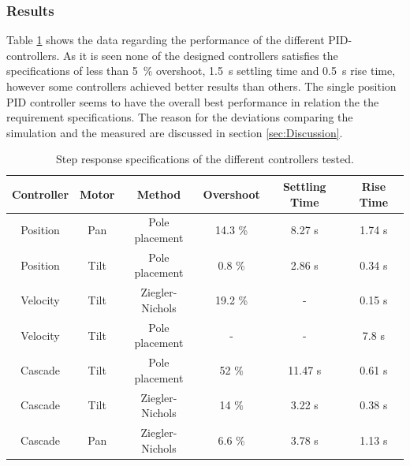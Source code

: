 \documentclass[../../main.tex]{subfiles}
\begin{document}
\subsubsection*{Results}
Table \ref{tab:controller_data} shows the data regarding the performance of the different PID-controllers. As it is seen none of the designed controllers satisfies the specifications of less than \SI{5}{\percent} overshoot, \SI{1,5}{\second} settling time and \SI{0,5}{\second} rise time, however some controllers achieved better results than others. The single position PID controller seems to have the overall best performance in relation the the requirement specifications. The reason for the deviations comparing the simulation and the measured are discussed in section \ref{sec:Discussion}.
\begin{table}[H]
    \centering
    \begin{tabular}{c|c|c|c|c|c}
         Controller & Motor & Method & Overshoot & Settling Time  & Rise Time \\ \hline
         Position & Pan & Pole placement & 14.3 \% & 8.27 s & 1.74 s \\
         Position & Tilt & Pole placement & 0.8 \% & 2.86 s & 0.34 s \\
         Velocity & Tilt & Ziegler-Nichols & 19.2 \% & - & 0.15 s \\
         Velocity &Tilt & Pole placement & - & - & 7.8 s\\
         Cascade & Tilt  & Pole placement & 52 \%  & 11.47 s  & 0.61 s\\
         Cascade & Tilt & Ziegler-Nichols & 14 \% & 3.22 s & 0.38 s \\
         Cascade & Pan & Ziegler-Nichols & 6.6 \% & 3.78 s & 1.13 s \\
         
    \end{tabular}
    \caption{Step response specifications of the different controllers tested.}
    \label{tab:controller_data}
\end{table}
\end{document}
